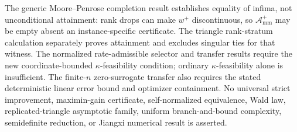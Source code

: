 The generic Moore--Penrose completion result establishes equality of infima, not unconditional attainment: rank drops can make \(w^+\) discontinuous, so \(\mathcal A_{\mathrm{mm}}^+\) may be empty absent an instance-specific certificate.  The triangle rank-stratum calculation separately proves attainment and excludes singular ties for that witness.  The normalized rate-admissible selector and transfer results require the new coordinate-bounded \(\kappa\)-feasibility condition; ordinary \(\kappa\)-feasibility alone is insufficient.  The finite-\(n\) zero-surrogate transfer also requires the stated deterministic linear error bound and optimizer containment.  No universal strict improvement, maximin-gain certificate, self-normalized equivalence, Wald law, replicated-triangle asymptotic family, uniform branch-and-bound complexity, semidefinite reduction, or Jiangxi numerical result is asserted.